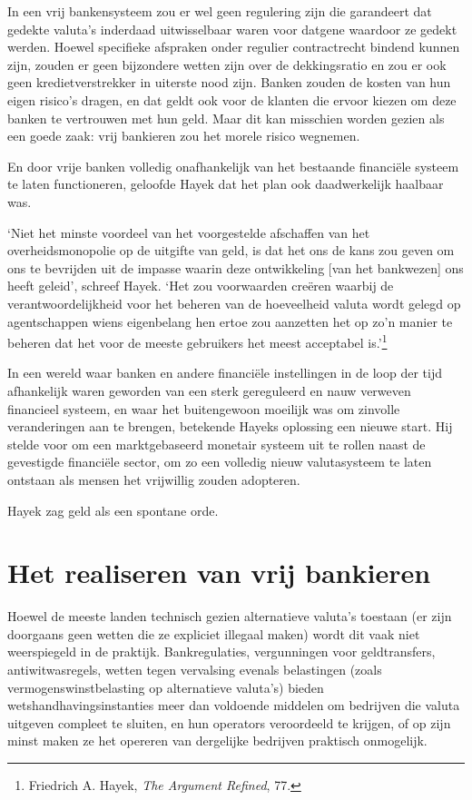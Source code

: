 \documentclass[
  a5paper,
  smalldemyvopaper,11pt,twoside,onecolumn,openright,extrafontsizes,
hidelinks]{memoir}
\begin{document}
In een vrij bankensysteem zou er wel geen regulering zijn die garandeert
dat gedekte valuta's inderdaad uitwisselbaar waren voor datgene waardoor
ze gedekt werden. Hoewel specifieke afspraken onder regulier
contractrecht bindend kunnen zijn, zouden er geen bijzondere wetten zijn
over de dekkingsratio en zou er ook geen kredietverstrekker in uiterste
nood zijn. Banken zouden de kosten van hun eigen risico's dragen, en dat
geldt ook voor de klanten die ervoor kiezen om deze banken te vertrouwen
met hun geld. Maar dit kan misschien worden gezien als een goede zaak:
vrij bankieren zou het morele risico wegnemen.

En door vrije banken volledig onafhankelijk van het bestaande financiële
systeem te laten functioneren, geloofde Hayek dat het plan ook
daadwerkelijk haalbaar was.

`Niet het minste voordeel van het voorgestelde afschaffen van het
overheidsmonopolie op de uitgifte van geld, is dat het ons de kans zou
geven om ons te bevrijden uit de impasse waarin deze ontwikkeling {[}van
het bankwezen{]} ons heeft geleid', schreef Hayek. `Het zou voorwaarden
creëren waarbij de verantwoordelijkheid voor het beheren van de
hoeveelheid valuta wordt gelegd op agentschappen wiens eigenbelang hen
ertoe zou aanzetten het op zo'n manier te beheren dat het voor de meeste
gebruikers het meest acceptabel is.'\footnote{Friedrich A. Hayek,
  \emph{The Argument Refined}, 77.}

In een wereld waar banken en andere financiële instellingen in de loop
der tijd afhankelijk waren geworden van een sterk gereguleerd en nauw
verweven financieel systeem, en waar het buitengewoon moeilijk was om
zinvolle veranderingen aan te brengen, betekende Hayeks oplossing een
nieuwe start. Hij stelde voor om een marktgebaseerd monetair systeem uit
te rollen naast de gevestigde financiële sector, om zo een volledig
nieuw valutasysteem te laten ontstaan als mensen het vrijwillig zouden
adopteren.

Hayek zag geld als een spontane orde.

\section{Het realiseren van vrij
bankieren}\label{het-realiseren-van-vrij-bankieren}

Hoewel de meeste landen technisch gezien alternatieve valuta's toestaan
(er zijn doorgaans geen wetten die ze expliciet illegaal maken) wordt
dit vaak niet weerspiegeld in de praktijk. Bankregulaties, vergunningen
voor geldtransfers, antiwitwasregels, wetten tegen vervalsing evenals
belastingen (zoals vermogenswinstbelasting op alternatieve valuta's)
bieden wetshandhavingsinstanties meer dan voldoende middelen om
bedrijven die valuta uitgeven compleet te sluiten, en hun operators
veroordeeld te krijgen, of op zijn minst maken ze het opereren van
dergelijke bedrijven praktisch onmogelijk.
\end{document}
